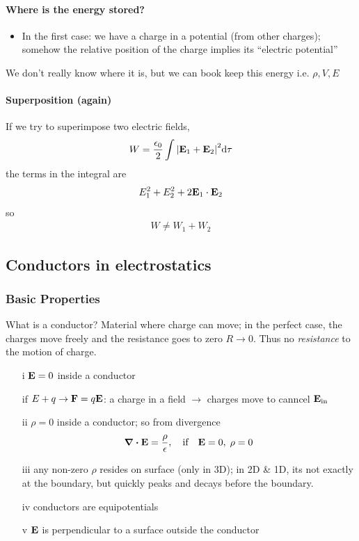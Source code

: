 \documentclass[../main.tex]{subfiles}
\begin{document}
\paragraph*{Where is the energy stored?}
\begin{itemize}
    \item In the first case: we have a charge in a potential (from other charges); somehow the relative position of the charge implies its ``electric potential''
\end{itemize}
We don't really know where it is, but we can book keep this energy i.e. $\rho, V, E$

\paragraph*{Superposition (again)} If we try to superimpose two electric fields,
\begin{align*}
    W = \frac{\epsilon_0}{2} \int \abs{\vb E_1 + \vb E_2}^2 \dd \tau
\end{align*}
the terms in the integral are 
\begin{align*}
    E_1^2 + E_2^2 + 2\vb E_1 \cdot \vb E_2
\end{align*}
so
\begin{align*}
    W \neq W_1 + W_2
\end{align*}

\subsection{Conductors in electrostatics}

\subsubsection{Basic Properties}

What is a conductor? Material where charge can move; in the perfect case, the charges move freely and the resistance goes to zero $R \to 0$.
Thus no \textit{resistance} to the motion of charge.

\begin{enumerate}
    \item [i] $\vb E = 0$ inside a conductor
    
    if $E + q \to \vb F = q \vb E$: a charge in a field $\to$ charges move to canncel $\vb E_{\textrm{in}}$
    \item [ii] $\rho = 0$ inside a conductor; so from divergence
    \begin{align*}
        \div \vb E = \frac{\rho}{\epsilon}, \qif \vb E = 0,\; \rho = 0
    \end{align*}
    \item [iii] any non-zero $\rho$ resides on surface (only in 3D);
    in 2D \& 1D, its not exactly at the boundary, but quickly peaks and decays before the boundary.
    \item [iv] conductors are equipotentials
    \item [v] $\vb E$ is perpendicular to a surface outside the conductor
\end{enumerate}
\end{document}
